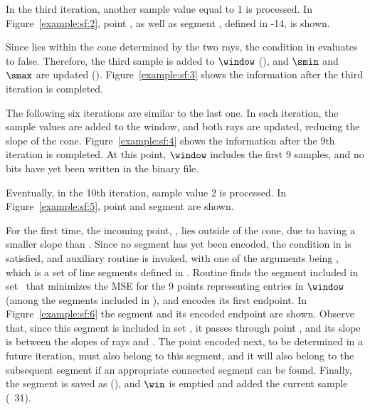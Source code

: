\vspace{+5pt}


In the third iteration, another sample value equal to 1 is processed. In Figure~\ref{example:sf:2}, point , as well as segment , defined in -14, is shown.


\vspace{+5pt}


\clearpage


Since  lies within the cone determined by the two rays, the condition in  evaluates to false. Therefore, the third sample is added to $\window$ (), and $\smin$ and $\smax$ are updated (). Figure~\ref{example:sf:3}  shows the information after the third iteration is completed. 


\vspace{+5pt}


The following six iterations are similar to the last one. In each iteration, the sample values are added to the window, and both rays are updated, reducing the slope of the cone. Figure~\ref{example:sf:4} shows the information after the 9th iteration is completed. At this point, $\window$ includes the first 9 samples, and no bits have yet been written in the binary file. 


\vspace{+5pt}


\clearpage


Eventually, in the 10th iteration, sample value 2 is processed. In Figure~\ref{example:sf:5}, point  and segment  are shown.




For the first time, the incoming point, , lies outside of the cone, due to  having a smaller slope than \smin. Since no segment has yet been encoded, the condition in  is satisfied, and auxiliary routine \CAWinStart is invoked, with one of the arguments being \segmentSet, which is a set of line segments defined in . Routine \CAWinStart finds the segment included in set \segmentSet\ that minimizes the MSE for the 9 points representing entries in $\window$ (among the segments included in \segmentSet), and encodes its first endpoint. In Figure~\ref{example:sf:6} the segment and its encoded endpoint are shown. Observe that, since this segment is included in set \segmentSet, it passes through point \interPoint, and its slope is between the slopes of rays \smin and \smax. The point encoded next, to be determined in a future iteration, must also belong to this segment, and it will also belong to the subsequent segment if an appropriate connected segment can be found. Finally, the segment is saved as \segmentLastT (), and $\win$ is emptied and added the current sample (\Line~31).


